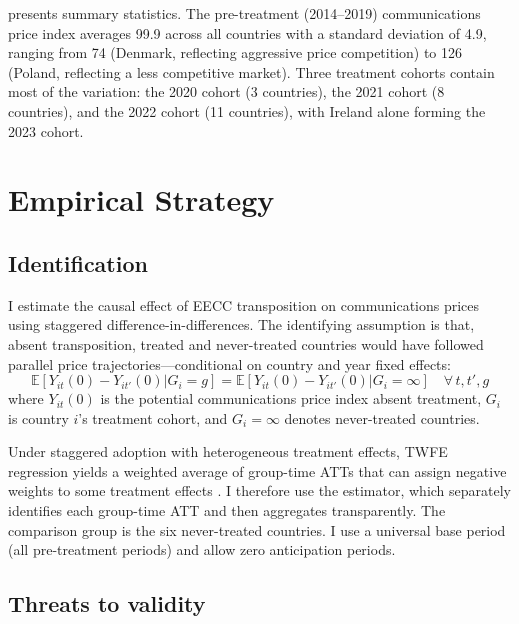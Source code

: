 \documentclass[12pt]{article}
\newcommand{\E}{\mathbb{E}}
\begin{document}
 presents summary statistics. The pre-treatment (2014--2019) communications price index averages 99.9 across all countries with a standard deviation of 4.9, ranging from 74 (Denmark, reflecting aggressive price competition) to 126 (Poland, reflecting a less competitive market). Three treatment cohorts contain most of the variation: the 2020 cohort (3 countries), the 2021 cohort (8 countries), and the 2022 cohort (11 countries), with Ireland alone forming the 2023 cohort.



\section{Empirical Strategy}

\subsection{Identification}

I estimate the causal effect of EECC transposition on communications prices using staggered difference-in-differences. The identifying assumption is that, absent transposition, treated and never-treated countries would have followed parallel price trajectories---conditional on country and year fixed effects:
\begin{equation}
\E[Y_{it}(0) - Y_{it'}(0) | G_i = g] = \E[Y_{it}(0) - Y_{it'}(0) | G_i = \infty] \quad \forall \, t, t', g
\end{equation}
where $Y_{it}(0)$ is the potential communications price index absent treatment, $G_i$ is country $i$'s treatment cohort, and $G_i = \infty$ denotes never-treated countries.

Under staggered adoption with heterogeneous treatment effects, TWFE regression yields a weighted average of group-time ATTs that can assign negative weights to some treatment effects \citep{goodmanbacon2021, dechaisemartin2020}. I therefore use the \citet{callaway2021} estimator, which separately identifies each group-time ATT and then aggregates transparently. The comparison group is the six never-treated countries. I use a universal base period (all pre-treatment periods) and allow zero anticipation periods.

\subsection{Threats to validity}
\end{document}
